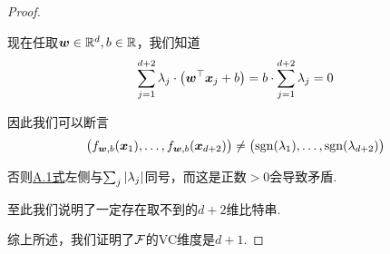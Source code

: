 \begin{proof}
\begin{enumerate}
    现在任取$\boldsymbol{w}\in \mathbb{R}^d, b\in \mathbb{R}$，我们知道 
    \begin{equation} \label{eq:hw2-1}
    \sum_{j=1}^{d+2} \lambda_j \cdot \big(\boldsymbol{w}^{\top}\boldsymbol{x}_j + b\big) = b \cdot \sum_{j=1}^{d+2} \lambda_j = 0
    \end{equation}

    因此我们可以断言
    \[
    \big(
        f_{\boldsymbol{w}, b}(\boldsymbol{x}_1), \dots, f_{\boldsymbol{w}, b}(\boldsymbol{x}_{d+2})
    \big) \neq \big(
        \mathrm{sgn}(\lambda_1), \dots, \mathrm{sgn}(\lambda_{d+2})
    \big)
    \]

    否则\hyperref[eq:hw2-1]{A.1式}左侧与$\sum_j \left\vert\lambda_j\right\vert$同号，而这是正数$>0$会导致矛盾.
    
    至此我们说明了一定存在取不到的$d+2$维比特串.
    
\end{enumerate}
综上所述，我们证明了$\mathcal{F}$的VC维度是$d+1$.
\end{proof}